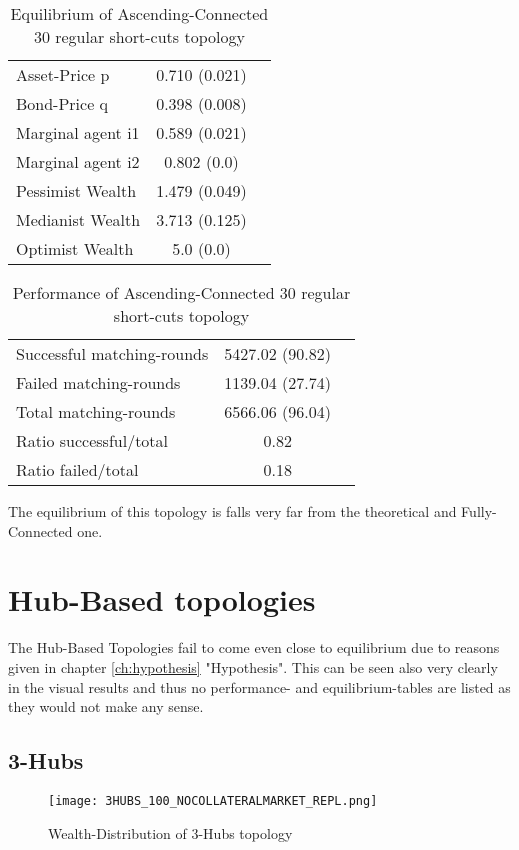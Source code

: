 \documentclass[Bachelorarbeit.tex]{subfiles}
\begin{document}
\begin{table}[H]
	\caption{Equilibrium of Ascending-Connected 30 regular short-cuts topology}
	\centering
	\begin{tabular} { l c r }
		\hline
		Asset-Price p & 0.710 (0.021) \\
		Bond-Price q & 0.398 (0.008) \\
		Marginal agent i1 & 0.589 (0.021) \\
		Marginal agent i2 & 0.802 (0.0) \\
		\hline
		Pessimist Wealth & 1.479 (0.049) \\
		Medianist Wealth & 3.713 (0.125) \\
		Optimist Wealth & 5.0 (0.0) \\
		\hline
	\end{tabular}
\end{table} 

\begin{table}[H]
	\caption{Performance of Ascending-Connected 30 regular short-cuts topology}
	\centering
	\begin{tabular} { l c r }
		\hline
		Successful matching-rounds& 5427.02 (90.82) \\
		Failed matching-rounds & 1139.04 (27.74) \\
		Total matching-rounds & 6566.06 (96.04) \\
		\hline
		Ratio successful/total & 0.82 \\
		Ratio failed/total & 0.18 \\
		\hline
	\end{tabular}
\end{table}

The equilibrium of this topology is falls very far from the theoretical and Fully-Connected one.

\section{Hub-Based topologies} 
The Hub-Based Topologies fail to come even close to equilibrium due to reasons given in chapter \ref{ch:hypothesis} "Hypothesis". This can be seen also very clearly in the visual results and thus no performance- and equilibrium-tables are listed as they would not make any sense.

\subsection{3-Hubs}
\begin{figure}[H]
	\centering
  \texttt{[image: 3HUBS\_100\_NOCOLLATERALMARKET\_REPL.png]}
	\caption{Wealth-Distribution of 3-Hubs topology}
	\label{fig:wealth_3HUBS_100_NOCOLLATERALMARKET_REPL}
\end{figure}
\end{document}
